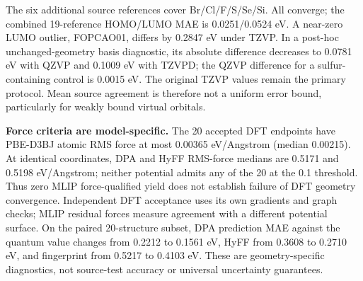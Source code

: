 \documentclass[11pt,a4paper]{article}
\begin{document}
The six additional source references cover Br/Cl/F/S/Se/Si. All
converge; the combined 19-reference HOMO/LUMO MAE is 0.0251/0.0524 eV. A
near-zero LUMO outlier, FOPCAO01, differs by 0.2847 eV under TZVP. In a
post-hoc unchanged-geometry basis diagnostic, its absolute difference
decreases to 0.0781 eV with QZVP and 0.1009 eV with TZVPD; the QZVP
difference for a sulfur-containing control is 0.0015 eV. The original
TZVP values remain the primary protocol. Mean source agreement is
therefore not a uniform error bound, particularly for weakly bound
virtual orbitals.

\textbf{Force criteria are model-specific.} The 20 accepted DFT
endpoints have PBE-D3BJ atomic RMS force at most 0.00365 eV/Angstrom
(median 0.00215). At identical coordinates, DPA and HyFF RMS-force
medians are 0.5171 and 0.5198 eV/Angstrom; neither potential admits any
of the 20 at the 0.1 threshold. Thus zero MLIP force-qualified yield
does not establish failure of DFT geometry convergence. Independent DFT
acceptance uses its own gradients and graph checks; MLIP residual forces
measure agreement with a different potential surface. On the paired
20-structure subset, DPA prediction MAE against the quantum value
changes from 0.2212 to 0.1561 eV, HyFF from 0.3608 to 0.2710 eV, and
fingerprint from 0.5217 to 0.4103 eV. These are geometry-specific
diagnostics, not source-test accuracy or universal uncertainty
guarantees.
\begingroup
\small
\raggedright

\endgroup
\end{document}
